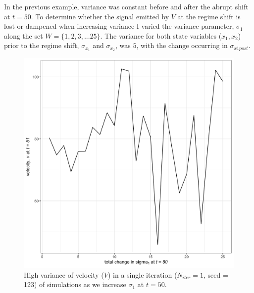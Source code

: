 \documentclass[print]{nuthesis}
\begin{document}
In the previous example, variance was constant before and after the abrupt shift at \(t=50\). To determine whether the signal emitted by \(V\) at the regime shift is lost or dampened when increasing variance I varied the variance parameter, \(\sigma_1\) along the set \(W = \{1,2,3,...25 \}\). The variance for both state variables (\(x_1, x_2\)) prior to the regime shift, \(\sigma_{x_1}\) and \(\sigma_{x_2}\), was \(5\), with the change occurring in \(\sigma_{x1post}\).
\begin{figure}
\includegraphics[width=0.85\linewidth]{./chapterFiles/velocity/figsCalledInDiss/simVarPlot} \caption{High variance of velocity ($V$) in a single iteration ($N_{iter}=1$, seed = 123) of simulations as we increase $\sigma_1$ at $t=50$.}\label{fig:simVarPlot}
\end{figure}
\end{document}

